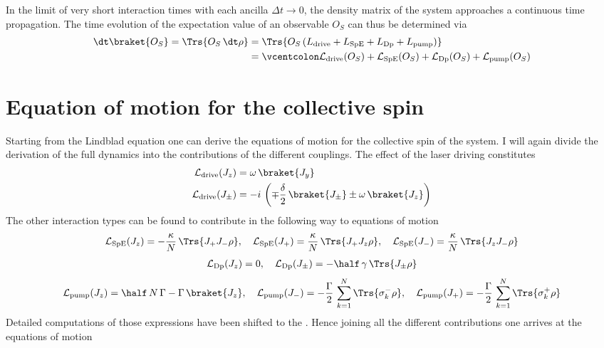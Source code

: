 In the limit of very short interaction times with each ancilla $\Delta t\rightarrow0$, the density matrix of the system approaches a continuous time propagation. The time evolution of the expectation value of an observable $O_S$ can thus be determined via 
\begin{align}
    \dt \braket{O_S}=\Trs{O_S\,\dt\rho}&=\Trs{O_S\,(L_\text{drive}+L_\text{SpE}+L_\text{Dp}+L_\text{pump})}\notag\\
    &=\vcentcolon \mathcal{L}_\text{drive}(O_S)+\mathcal{L}_\text{SpE}(O_S)+\mathcal{L}_\text{Dp}(O_S)+\mathcal{L}_\text{pump}(O_S)
\end{align}

\section[mean field equations]{Equation of motion for the collective spin}
Starting from the Lindblad equation one can derive the equations of motion for the collective spin of the system. I will again divide the derivation of the full dynamics into the contributions of the different couplings. The effect of the laser driving constitutes 
\begin{align*}
    \mathcal{L}_\text{drive}(J_z)&=\omega\,\braket{J_y}\\
    \mathcal{L}_\text{drive}(J_\pm)&=-i\,\left(\mp\frac{\delta}{2}\, \braket{J_\pm} \pm \omega\, \braket{J_z}\right)
\end{align*}
The other interaction types can be found to contribute in the following way to equations of motion
\begin{align*}
    \mathcal{L}_\text{SpE}(J_z)=-\frac{\kappa}{N}\,\Trs{J_+ J_- \rho},\quad
    \mathcal{L}_\text{SpE}(J_+)=\frac{\kappa}{N}\,\Trs{J_+ J_z \rho},\quad
    \mathcal{L}_\text{SpE}(J_-)=\frac{\kappa}{N}\,\Trs{J_z J_- \rho}
\end{align*}
\begin{align}
    \mathcal{L}_\text{Dp}(J_z)=0,\quad
    \mathcal{L}_\text{Dp}(J_\pm)=-\half\,\gamma\,\Trs{J_\pm\rho}
\end{align}
\begin{align*}
    \mathcal{L}_\text{pump}(J_z)=\half\,N\,\Gamma-\Gamma\,\braket{J_z},\quad
    \mathcal{L}_\text{pump}(J_-)=-\frac{\Gamma}{2}\,\sum_{k=1}^N\Trs{\sigma_k^-\rho},\quad
    \mathcal{L}_\text{pump}(J_+)=-\frac{\Gamma}{2}\,\sum_{k=1}^N\Trs{\sigma_k^+\rho}
\end{align*}
Detailed computations of those expressions have been shifted to the . Hence joining all the different contributions one arrives at the equations of motion
